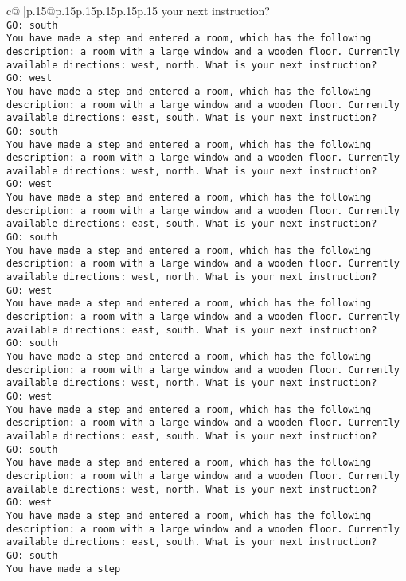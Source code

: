 \documentclass{article}
\begin{document}
{\begin{supertabular}{c@{$\;$}|p{.15\linewidth}@{}p{.15\linewidth}p{.15\linewidth}p{.15\linewidth}p{.15\linewidth}p{.15\linewidth}}
{{{your next instruction?\\ \tt GO: south\\ \tt You have made a step and entered a room, which has the following description: a room with a large window and a wooden floor. Currently available directions: west, north. What is your next instruction?\\ \tt GO: west\\ \tt You have made a step and entered a room, which has the following description: a room with a large window and a wooden floor. Currently available directions: east, south. What is your next instruction?\\ \tt GO: south\\ \tt You have made a step and entered a room, which has the following description: a room with a large window and a wooden floor. Currently available directions: west, north. What is your next instruction?\\ \tt GO: west\\ \tt You have made a step and entered a room, which has the following description: a room with a large window and a wooden floor. Currently available directions: east, south. What is your next instruction?\\ \tt GO: south\\ \tt You have made a step and entered a room, which has the following description: a room with a large window and a wooden floor. Currently available directions: west, north. What is your next instruction?\\ \tt GO: west\\ \tt You have made a step and entered a room, which has the following description: a room with a large window and a wooden floor. Currently available directions: east, south. What is your next instruction?\\ \tt GO: south\\ \tt You have made a step and entered a room, which has the following description: a room with a large window and a wooden floor. Currently available directions: west, north. What is your next instruction?\\ \tt GO: west\\ \tt You have made a step and entered a room, which has the following description: a room with a large window and a wooden floor. Currently available directions: east, south. What is your next instruction?\\ \tt GO: south\\ \tt You have made a step and entered a room, which has the following description: a room with a large window and a wooden floor. Currently available directions: west, north. What is your next instruction?\\ \tt GO: west\\ \tt You have made a step and entered a room, which has the following description: a room with a large window and a wooden floor. Currently available directions: east, south. What is your next instruction?\\ \tt GO: south\\ \tt You have made a step }}}
\end{supertabular}}
\end{document}

